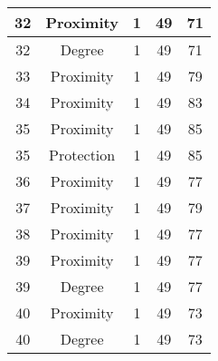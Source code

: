 \documentclass[results.tex]{subfiles}
\begin{document}
\begin{center}
\begin{tabular}{| c || c | c | c | c |}
            \hline
            32                      & Proximity                    & 1                      & 49                      & 71                   \\
            \hline
            32                      & Degree                       & 1                      & 49                      & 71                   \\
            \hline
            33                      & Proximity                    & 1                      & 49                      & 79                   \\
            \hline
            34                      & Proximity                    & 1                      & 49                      & 83                   \\
            \hline
            35                      & Proximity                    & 1                      & 49                      & 85                   \\
            \hline
            35                      & Protection                   & 1                      & 49                      & 85                   \\
            \hline
            36                      & Proximity                    & 1                      & 49                      & 77                   \\
            \hline
            37                      & Proximity                    & 1                      & 49                      & 79                   \\
            \hline
            38                      & Proximity                    & 1                      & 49                      & 77                   \\
            \hline
            39                      & Proximity                    & 1                      & 49                      & 77                   \\
            \hline
            39                      & Degree                       & 1                      & 49                      & 77                   \\
            \hline
            40                      & Proximity                    & 1                      & 49                      & 73                   \\
            \hline
            40                      & Degree                       & 1                      & 49                      & 73                   \\

\end{tabular}
\end{center}
\end{document}
